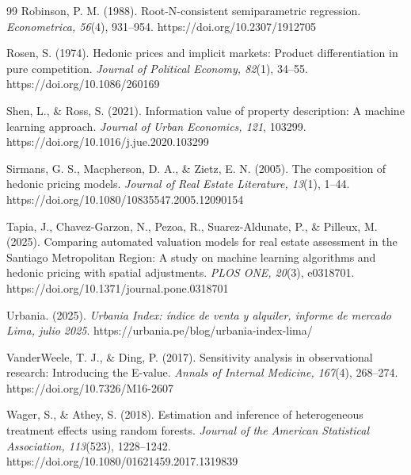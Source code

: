 \begin{thebibliography}{99}
Robinson, P. M. (1988). Root-N-consistent semiparametric regression. \textit{Econometrica, 56}(4), 931--954. https://doi.org/10.2307/1912705

Rosen, S. (1974). Hedonic prices and implicit markets: Product differentiation in pure competition. \textit{Journal of Political Economy, 82}(1), 34--55. https://doi.org/10.1086/260169

Shen, L., \& Ross, S. (2021). Information value of property description: A machine learning approach. \textit{Journal of Urban Economics, 121}, 103299. https://doi.org/10.1016/j.jue.2020.103299

Sirmans, G. S., Macpherson, D. A., \& Zietz, E. N. (2005). The composition of hedonic pricing models. \textit{Journal of Real Estate Literature, 13}(1), 1--44. https://doi.org/10.1080/10835547.2005.12090154

Tapia, J., Chavez-Garzon, N., Pezoa, R., Suarez-Aldunate, P., \& Pilleux, M. (2025). Comparing automated valuation models for real estate assessment in the Santiago Metropolitan Region: A study on machine learning algorithms and hedonic pricing with spatial adjustments. \textit{PLOS ONE, 20}(3), e0318701. https://doi.org/10.1371/journal.pone.0318701

Urbania. (2025). \textit{Urbania Index: índice de venta y alquiler, informe de mercado Lima, julio 2025}. https://urbania.pe/blog/urbania-index-lima/

VanderWeele, T. J., \& Ding, P. (2017). Sensitivity analysis in observational research: Introducing the E-value. \textit{Annals of Internal Medicine, 167}(4), 268--274. https://doi.org/10.7326/M16-2607

Wager, S., \& Athey, S. (2018). Estimation and inference of heterogeneous treatment effects using random forests. \textit{Journal of the American Statistical Association, 113}(523), 1228--1242. https://doi.org/10.1080/01621459.2017.1319839

\end{thebibliography}
